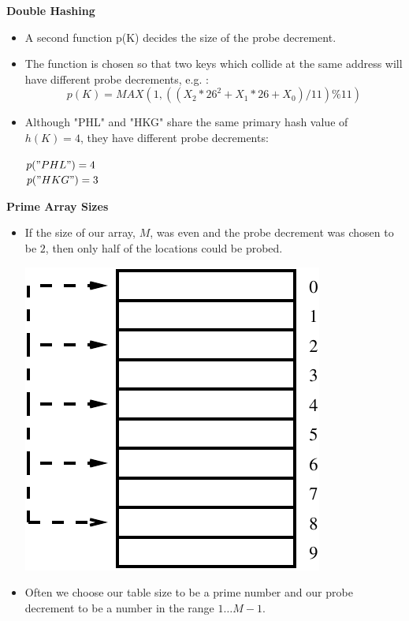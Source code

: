\newpage
{\samepage
\begin{center}
{\Large{\bf Double Hashing}}
\end{center}
\begin{itemize}
\item A second function p(K) decides the size of the probe decrement.
\item The function is chosen so that two keys which collide at the same address will have different probe decrements, e.g. :
{\small
\[
p(K) = MAX (1, ((X_2*26^2 + X_1*26+X_0)/11)\%11)
\]
}
\item Although "PHL" and "HKG" share the same primary hash value of $h(K)=4$, they
have different probe decrements:

$p("PHL")=4$\\

$p("HKG")=3$
\end{itemize}
}

\newpage
{\samepage
\begin{center}
{\Large{\bf Prime Array Sizes}}
\end{center}
\begin{itemize}
\item If the size of our array, $M$, was even and the probe decrement was chosen to be $2$, then only half of the locations could be probed.
\begin{center}
\includegraphics{../Images/hashp2.pdf}
\end{center}
\item Often we choose our table size to be a prime number and our probe decrement to be a number in the range $1 \ldots M-1$.
\end{itemize}
}

